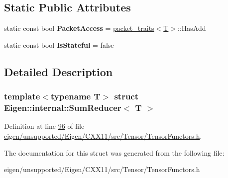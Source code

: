 \subsection*{Static Public Attributes}
\begin{DoxyCompactItemize}
\item 
\mbox{\label{struct_eigen_1_1internal_1_1_sum_reducer_a3b0a489bc85417cab83ea4fe1dc080c2}} 
static const bool {\bfseries Packet\+Access} = \hyperlink{struct_eigen_1_1internal_1_1packet__traits}{packet\+\_\+traits}$<$\hyperlink{group___sparse_core___module}{T}$>$\+::Has\+Add
\item 
\mbox{\label{struct_eigen_1_1internal_1_1_sum_reducer_a42bdf839e424a8b5b1b3d83a73b434f3}} 
static const bool {\bfseries Is\+Stateful} = false
\end{DoxyCompactItemize}


\subsection{Detailed Description}
\subsubsection*{template$<$typename T$>$\newline
struct Eigen\+::internal\+::\+Sum\+Reducer$<$ T $>$}



Definition at line \hyperlink{eigen_2unsupported_2_eigen_2_c_x_x11_2src_2_tensor_2_tensor_functors_8h_source_l00096}{96} of file \hyperlink{eigen_2unsupported_2_eigen_2_c_x_x11_2src_2_tensor_2_tensor_functors_8h_source}{eigen/unsupported/\+Eigen/\+C\+X\+X11/src/\+Tensor/\+Tensor\+Functors.\+h}.



The documentation for this struct was generated from the following file\+:\begin{DoxyCompactItemize}
\item 
eigen/unsupported/\+Eigen/\+C\+X\+X11/src/\+Tensor/\+Tensor\+Functors.\+h\end{DoxyCompactItemize}
